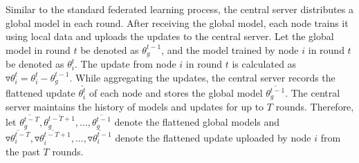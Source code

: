 \documentclass[lettersize,journal]{IEEEtran}
\begin{document}
Similar to the standard federated learning process, the central server distributes a global model in each round. After receiving the global model, each node trains it using local data and uploads the updates to the central server. Let the global model in round $t$ be denoted as $\theta^{t-1}_g$, and the model trained by node $i$ in round $t$ be denoted as $\theta^t_i$. The update from node $i$ in round $t$ is calculated as $\triangledown \theta^t_{i} = \theta^t_{i} - \theta^{t-1}_g$. 
While aggregating the updates, the central server records the flattened update $\bar{\theta_i^t}$ of each node and stores the global model $\overline{\theta_g^{t-1}}$. The central server maintains the history of models and updates for up to $T$ rounds. 
Therefore, let \( \overline{\theta_g^{t-T}}, \overline{\theta_g^{t-T+1}}, \dots, \overline{\theta_g^{t-1}} \) denote the flattened global models and \( \overline{\triangledown\theta_{i}^{t-T}}, \overline{\triangledown\theta_{i}^{t-T+1}}, \dots, \overline{\triangledown\theta_{i}^{t-1}} \) denote the flattened update uploaded by node \(i\) from the past \(T\) rounds.

\end{document}
